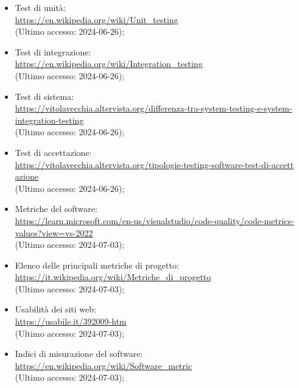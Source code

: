 \begin{itemize}
  \item Test di unità: \\ \href{https://en.wikipedia.org/wiki/Unit_testing}{https://en.wikipedia.org/wiki/Unit\_testing}  \\ (Ultimo accesso: 2024-06-26);
  \item Test di integrazione: \\ \href{https://en.wikipedia.org/wiki/Integration_testing}{https://en.wikipedia.org/wiki/Integration\_testing}  \\ (Ultimo accesso: 2024-06-26);
  \item Test di sistema: \\ \href{https://vitolavecchia.altervista.org/differenza-tra-system-testing-e-system-integration-testing}{https://vitolavecchia.altervista.org/differenza-tra-system-testing-e-system-\\integration-testing}  \\ (Ultimo accesso: 2024-06-26);
  \item Test di accettazione: \\ \href{https://vitolavecchia.altervista.org/tipologie-testing-software-test-di-accettazione}{https://vitolavecchia.altervista.org/tipologie-testing-software-test-di-accett \- azione}  \\ (Ultimo accesso: 2024-06-26);
  \item Metriche del software: \\ \href{https://learn.microsoft.com/en-us/visualstudio/code-quality/code-metrics-values?view=vs-2022}{https://learn.microsoft.com/en-us/visualstudio/code-quality/code-metrics-\\values?view=vs-2022}  \\ (Ultimo accesso: 2024-07-03);
  \item Elenco delle principali metriche di progetto: \\ \href{https://it.wikipedia.org/wiki/Metriche_di_progetto}{https://it.wikipedia.org/wiki/Metriche\_di\_progetto}  \\ (Ultimo accesso: 2024-07-03); 
  \item Usabilità dei siti web: \\ \href{https://usabile.it/392009-htm}{https://usabile.it/392009-htm}  \\ (Ultimo accesso: 2024-07-03);
  \item Indici di misurazione del software: \\ \href{https://en.wikipedia.org/wiki/Software_metric}{https://en.wikipedia.org/wiki/Software\_metric}  \\ (Ultimo accesso: 2024-07-03);

\end{itemize}

